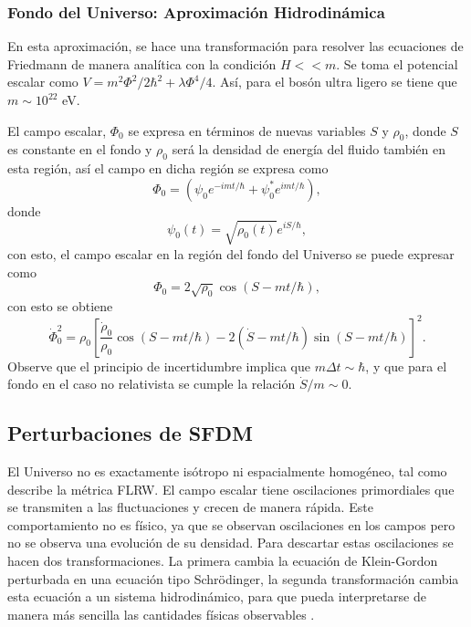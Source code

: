 \documentclass[a4paper,openright,12pt]{book}
\begin{document}
\subsubsection{Fondo del Universo: Aproximación Hidrodinámica}
En esta aproximación, se hace una transformación para resolver las ecuaciones de Friedmann de manera analítica con la condición $H<<m$. Se toma el potencial escalar como $V = m^{2}\Phi^{2}/2\hbar^{2} + \lambda\Phi^{4}/4$. Así, para el bosón ultra ligero se tiene que $m \sim 10^{22}$ eV.

El campo escalar, $\Phi_{0}$ se expresa en términos de nuevas variables $S$ y $\rho_{0}$, donde $S$ es constante en el fondo y $\rho_{0}$ será la densidad de energía del fluido también en esta región, así el campo en dicha región se expresa como
\begin{equation}
\Phi_{0} = (\psi_{0}e^{-imt/\hbar} + \psi_{0}^{*}e^{imt/\hbar}),\label{eqn 1.60}
\end{equation}
donde
\begin{equation}
\psi_{0}(t) = \sqrt{\rho_{0}(t)}e^{iS/\hbar},\label{eqn 1.61}
\end{equation}
con esto, el campo escalar en la región del fondo del Universo se puede expresar como 
\begin{equation}
\Phi_{0}=2\sqrt{\rho_{0}}\cos(S-mt/\hbar),\label{eqn 1.62}
\end{equation}
con esto se obtiene
\begin{equation}
\dot{\Phi}_{0}^{2} = \rho_{0} 
\left[
\frac{\dot{\rho}_{0}}{\rho_{0}}\cos(S-mt/\hbar) 
- 2(\dot{S}-mt/\hbar)\sin(S-mt/\hbar)
\right]^{2}.\label{eqn 1.63}
\end{equation}
Observe que el principio de incertidumbre implica que $m \Delta t \sim \hbar$, y que para el fondo en el caso no relativista se cumple la relación $\dot{S}/m \sim 0$. 
\subsection{Perturbaciones de SFDM}
El Universo no es exactamente isótropo ni espacialmente homogéneo, tal como describe la métrica FLRW. El campo escalar tiene oscilaciones primordiales que se transmiten a las fluctuaciones y crecen de manera rápida. Este comportamiento no es físico, ya que se observan oscilaciones en los campos pero no se observa una evolución de su densidad. Para descartar estas oscilaciones se hacen dos transformaciones. La primera cambia la ecuación de Klein-Gordon perturbada en una ecuación tipo Schrödinger, la segunda transformación cambia esta ecuación a un sistema hidrodinámico, para que pueda interpretarse de manera más sencilla las cantidades físicas observables \cite{1.3.02.2}.
\end{document}
